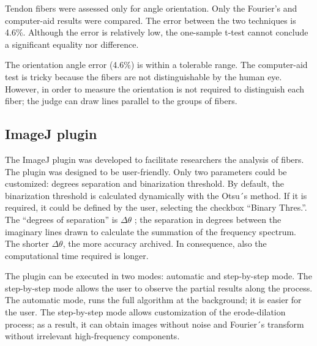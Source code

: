 \documentclass[12pt,a4paper]{article}
\begin{document}
Tendon fibers were assessed only for angle orientation. Only the Fourier’s and computer-aid results were compared. The error between the two techniques is 4.6\%. Although the error is relatively low, the one-sample t-test cannot conclude a significant equality nor difference.

The orientation angle error (4.6\%) is within a tolerable range. The computer-aid test is tricky because the fibers are not distinguishable by the human eye. However, in order to measure the orientation is not required to distinguish each fiber; the judge can draw lines parallel to the groups of fibers.

\subsection{ImageJ plugin}

The ImageJ plugin was developed to facilitate researchers the analysis of fibers. The plugin was designed to be user-friendly. Only two parameters could be customized: degrees separation and binarization threshold. By default, the binarization threshold is calculated dynamically with the Otsu´s method. If it is required, it could be defined by the user, selecting the checkbox “Binary Thres.”. The “degrees of separation” is $\Delta\theta$ ; the separation in degrees between the imaginary lines drawn to calculate the summation of  the frequency spectrum. The shorter $\Delta\theta$, the more accuracy archived.  In consequence, also the computational time required is longer.

The plugin can be executed in two modes: automatic and step-by-step mode. The step-by-step mode allows the user to observe the partial results along the process. The automatic mode, runs the full algorithm at the background; it is easier for the user. The step-by-step mode allows customization of the erode-dilation process; as a result, it can obtain images without noise and Fourier´s transform without irrelevant high-frequency components. 
\end{document}

